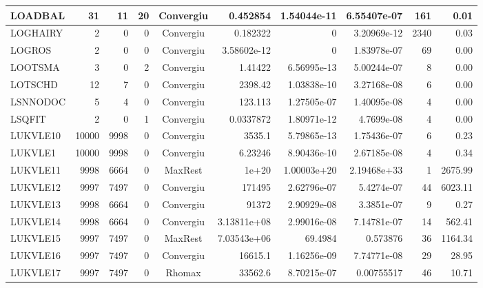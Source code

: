\begin{center}
\begin{longtable}{|l|r|r|r|c|r|r|r|r|r|}
 LOADBAL &     31 &     11 &     20 & Convergiu  &    0.452854 &    1.54044e-11 & 6.55407e-07 &    161 &    0.01 \\ \hline
LOGHAIRY &      2 &      0 &      0 & Convergiu  &    0.182322 &              0 & 3.20969e-12 &   2340 &    0.03 \\ \hline
  LOGROS &      2 &      0 &      0 & Convergiu  & 3.58602e-12 &              0 & 1.83978e-07 &     69 &    0.00 \\ \hline
 LOOTSMA &      3 &      0 &      2 & Convergiu  &     1.41422 &    6.56995e-13 & 5.00244e-07 &      8 &    0.00 \\ \hline
 LOTSCHD &     12 &      7 &      0 & Convergiu  &     2398.42 &    1.03838e-10 & 3.27168e-08 &      6 &    0.00 \\ \hline
LSNNODOC &      5 &      4 &      0 & Convergiu  &     123.113 &    1.27505e-07 & 1.40095e-08 &      4 &    0.00 \\ \hline
  LSQFIT &      2 &      0 &      1 & Convergiu  &   0.0337872 &    1.80971e-12 &  4.7699e-08 &      4 &    0.00 \\ \hline
LUKVLE10 &  10000 &   9998 &      0 & Convergiu  &      3535.1 &    5.79865e-13 & 1.75436e-07 &      6 &    0.23 \\ \hline
 LUKVLE1 &  10000 &   9998 &      0 & Convergiu  &     6.23246 &    8.90436e-10 & 2.67185e-08 &      4 &    0.34 \\ \hline
LUKVLE11 &   9998 &   6664 &      0 & MaxRest    &       1e+20 &    1.00003e+20 & 2.19468e+33 &      1 & 2675.99 \\ \hline
LUKVLE12 &   9997 &   7497 &      0 & Convergiu  &      171495 &    2.62796e-07 &  5.4274e-07 &     44 & 6023.11 \\ \hline
LUKVLE13 &   9998 &   6664 &      0 & Convergiu  &       91372 &    2.90929e-08 &  3.3851e-07 &      9 &    0.27 \\ \hline
LUKVLE14 &   9998 &   6664 &      0 & Convergiu  & 3.13811e+08 &    2.99016e-08 & 7.14781e-07 &     14 &  562.41 \\ \hline
LUKVLE15 &   9997 &   7497 &      0 & MaxRest    & 7.03543e+06 &        69.4984 &    0.573876 &     36 & 1164.34 \\ \hline
LUKVLE16 &   9997 &   7497 &      0 & Convergiu  &     16615.1 &    1.16256e-09 & 7.74771e-08 &     29 &   28.95 \\ \hline
LUKVLE17 &   9997 &   7497 &      0 & Rhomax     &     33562.6 &    8.70215e-07 &  0.00755517 &     46 &   10.71 \\ \hline

\end{longtable}
\end{center}
